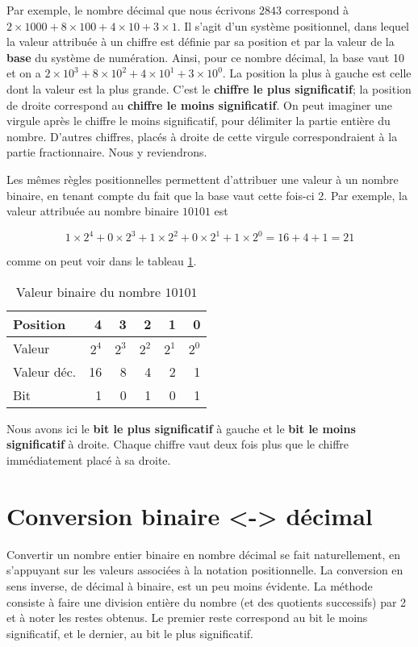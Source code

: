 \documentclass[letter, oneside]{book}
\begin{document}
Par exemple, le nombre décimal que nous écrivons \(2843\) correspond à
\(2 \times 1000 + 8 \times 100 + 4 \times 10 + 3 \times 1\). Il s'agit
d'un système positionnel, dans lequel la valeur attribuée à un chiffre
est définie par sa position et par la valeur de la \textbf{base} du système
de numération. Ainsi, pour ce nombre décimal, la base vaut 10 et on a
\(2 \times 10^3 + 8 \times 10^2 + 4 \times 10^1 + 3 \times 10^0\). La
position la plus à gauche est celle dont la valeur est la plus
grande. C'est le \textbf{chiffre le plus significatif}; la position de droite
correspond au \textbf{chiffre le moins significatif}. On peut imaginer une
virgule après le chiffre le moins significatif, pour délimiter la
partie entière du nombre. D'autres chiffres, placés à droite de cette
virgule correspondraient à la partie fractionnaire. Nous y reviendrons.

Les mêmes règles positionnelles permettent d'attribuer une valeur à un
nombre binaire, en tenant compte du fait que la base vaut cette
fois-ci 2. Par exemple, la valeur attribuée au nombre binaire
\(10101\) est 

$$ 1 \times 2^4 + 0 \times 2^3 + 1 \times 2^2 + 0 \times 2^1 + 1
\times 2^0 = 16+4+1= 21 $$

comme on peut voir dans le tableau \ref{tab:org9f005c9}.

\begin{table}[htbp]
\caption{\label{tab:org9f005c9}Valeur binaire du nombre \(10101\)}
\centering
\begin{tabular}{lrrrrr}
Position & 4 & 3 & 2 & 1 & 0\\[0pt]
\hline
Valeur & \(2^4\) & \(2^3\) & \(2^2\) & \(2^1\) & \(2^0\)\\[0pt]
Valeur déc. & 16 & 8 & 4 & 2 & 1\\[0pt]
Bit & 1 & 0 & 1 & 0 & 1\\[0pt]
\end{tabular}
\end{table}

Nous avons ici le \textbf{bit le plus significatif} à gauche et le \textbf{bit le
moins significatif} à droite. Chaque chiffre vaut deux fois plus que le
chiffre immédiatement placé à sa droite.

\section{Conversion binaire <-> décimal}
\label{sec:org2e01cbd}

Convertir un nombre entier binaire en nombre décimal se fait
naturellement, en s'appuyant sur les valeurs associées à la notation
positionnelle. La conversion en sens inverse, de décimal à binaire,
est un peu moins évidente. La méthode consiste à faire une division
entière du nombre (et des quotients successifs) par 2 et à noter les
restes obtenus. Le premier reste correspond au bit le moins
significatif, et le dernier, au bit le plus significatif.
\end{document}
